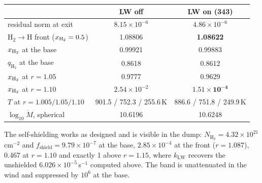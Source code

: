 \documentclass[english,a4paper]{my_memo}
\newcommand{\Mdot}{\dot{M}}
\newcommand{\qHH}{q_{\mathrm{H_2}}}
\begin{document}
\begin{center}\small
\begin{tabular}{@{}lcc@{}}
\toprule
 & LW off & \textbf{LW on (343)} \\
\midrule
residual norm at exit & $8.15\times10^{-6}$ & $4.86\times10^{-6}$ \\
H$_2\to$H front ($x_{\rm H_2}=0.5$) & 1.08806 & \textbf{1.08622} \\
$x_{\rm H_2}$ at the base & 0.99921 & 0.99883 \\
$\qHH$ at the base & 0.8618 & 0.8612 \\
$x_{\rm H_2}$ at $r=1.05$ & 0.9777 & 0.9629 \\
$x_{\rm H_2}$ at $r=1.10$ & $2.54\times10^{-2}$ & $\mathbf{1.51\times10^{-4}}$ \\
$T$ at $r=1.005/1.05/1.10$ & 901.5 / 752.3 / 255.6\,K & 886.6 / 751.8 / 249.9\,K \\
$\log_{10}\Mdot$, spherical & 10.6196 & 10.6248 \\
\bottomrule
\end{tabular}
\end{center}

\noindent The self-shielding works as designed and is visible in the dump:
$N_\mathrm{H_2}=4.32\times10^{21}$\,cm$^{-2}$ and
$f_\mathrm{shield}=9.79\times10^{-7}$ at the base,
$2.85\times10^{-4}$ at the front ($r=1.087$), 0.467 at $r=1.10$ and exactly 1
above $r=1.15$, where $k_\mathrm{LW}$ recovers the unshielded
$6.026\times10^{-5}$\,s$^{-1}$ computed above. The band is unattenuated in the
wind and suppressed by $10^{6}$ at the base.
\end{document}
